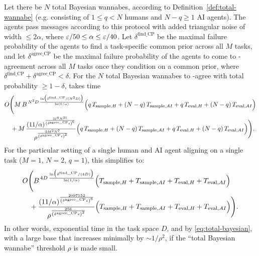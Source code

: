 \begin{corollary}\label{cor:wannabe-agree}
Let there be $N$ total Bayesian wannabes, according to Definition~\ref{def:total-wannabe} (e.g. consisting of $1 \le q < N$ humans and $N-q \ge 1$ AI agents).
The agents pass messages according to this protocol with added triangular noise of width $\le 2\alpha$, where $\varepsilon/50 \le \alpha \le \varepsilon/40$.
Let $\delta^{\text{find\_CP}}$ be the maximal failure probability of the agents to find a task-specific common prior across all $M$ tasks, and let $\delta^{\text{agree\_CP}}$ be the maximal failure probability of the agents to come to \agree-agreement across all $M$ tasks once they condition on a common prior, where $\delta^{\text{find\_CP}} + \delta^{\text{agree\_CP}} < \delta$.
For the $N$ total Bayesian wannabes to \agree-agree with total probability $\ge 1-\delta$, takes time
\begin{equation*}
\begin{split}
&O\Biggl(M\,{B}^{\,N^2 D\, \frac{\ln\bigl(\delta^{\text{find\_CP}}/(N^2 D)\bigr)}{\ln(1/\alpha)}} 
\Bigl( q\,T_{\text{sample},H} + (N-q)\,T_{\text{sample},AI} + q\,T_{\text{eval},H} + (N-q)\,T_{\text{eval},AI} \Bigr) \\
& \quad{} + M\,\frac{\left(11/\alpha\right)^{\frac{M^6 N^{21}}{\left(\delta^{\text{agree\_CP}}\epsilon\right)^6}}}{\rho^{\frac{2M^2 N^7}{\left(\delta^{\text{agree\_CP}}\epsilon\right)^2}}}
\Bigl( q\,T_{\text{sample},H} + (N-q)\,T_{\text{sample},AI} + q\,T_{\text{eval},H} + (N-q)\,T_{\text{eval},AI} \Bigr)
\Biggr).
\end{split}
\end{equation*}
For the particular setting of a single human and AI agent aligning on a single task ($M=1$, $N=2$, $q=1$), this simplifies to:
\begin{equation*}
\begin{split}
&O\Biggl({B}^{\,4D\, \frac{\ln\bigl(\delta^{\text{find\_CP}}/(4D)\bigr)}{\ln(1/\alpha)}} 
\Bigl(T_{\text{sample},H} + T_{\text{sample},AI} + T_{\text{eval},H} + T_{\text{eval},AI} \Bigr) \\
& \quad{} + \frac{\left(11/\alpha\right)^{\frac{2097152}{\left(\delta^{\text{agree\_CP}}\epsilon\right)^6}}}{\rho^{\frac{256}{\left(\delta^{\text{agree\_CP}}\epsilon\right)^2}}}
\Bigl(T_{\text{sample},H} + T_{\text{sample},AI} + T_{\text{eval},H} + T_{\text{eval},AI} \Bigr)
\Biggr).
\end{split}
\end{equation*}
In other words, exponential time in the task space $D$, and by \eqref{eq:total-bayesian}, with a large base that increases minimally by $\sim 1/\rho^2$, if the ``total Bayesian wannabe'' threshold $\rho$ is made small.


\end{corollary}
